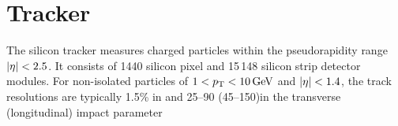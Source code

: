 
\section{Tracker}

The silicon tracker measures charged particles within the pseudorapidity range $\lvert \eta \rvert < 2.5$. It consists of 1440 silicon pixel and 15\,148 silicon strip detector modules. For non-isolated particles of $1 < p_{\mathrm{T}} < 10\,\text{Ge\hspace{-.08em}V}$ and $\lvert \eta \rvert < 1.4$, the track resolutions are typically 1.5\% in \pt and 25--90 (45--150)\mum in the transverse (longitudinal) impact parameter \cite{TRK-11-001} 

